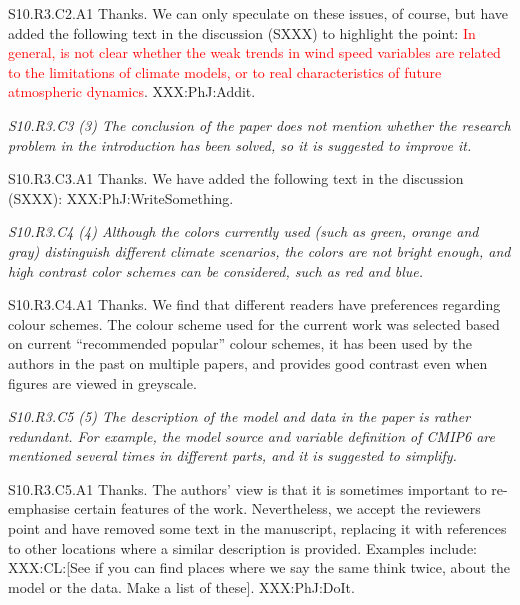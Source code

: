 \documentclass[a4paper,10pt]{article}
\newcommand{\ed}[1]{\textcolor{red}{#1}}
\begin{document}
	S10.R3.C2.A1 Thanks. We can only speculate on these issues, of course, but have added the following text in the discussion (SXXX) to highlight the point: \ed{In general, is not clear whether the weak trends in wind speed variables are related to the limitations of climate models, or to real characteristics of future atmospheric dynamics}. XXX:PhJ:Addit. 

	\emph{S10.R3.C3 (3) The conclusion of the paper does not mention whether the research problem in the introduction has been solved, so it is suggested to improve it.}

	S10.R3.C3.A1 Thanks. We have added the following text in the discussion (SXXX): XXX:PhJ:WriteSomething.

	\emph{S10.R3.C4 (4) Although the colors currently used (such as green, orange and gray) distinguish different climate scenarios, the colors are not bright enough, and high contrast color schemes can be considered, such as red and blue.}

	S10.R3.C4.A1 Thanks. We find that different readers have preferences regarding colour schemes. The colour scheme used for the current work was selected based on current ``recommended popular'' colour schemes, it has been used by the authors in the past on multiple papers, and provides good contrast even when figures are viewed in greyscale.

	\emph{S10.R3.C5 (5) The description of the model and data in the paper is rather redundant. For example, the model source and variable definition of CMIP6 are mentioned several times in different parts, and it is suggested to simplify.}

	S10.R3.C5.A1 Thanks. The authors' view is that it is sometimes important to re-emphasise certain features of the work. Nevertheless, we accept the reviewers point and have removed some text in the manuscript, replacing it with references to other locations where a similar description is provided. Examples include: XXX:CL:[See if you can find places where we say the same think twice, about the model or the data. Make a list of these]. XXX:PhJ:DoIt.
\end{document}
